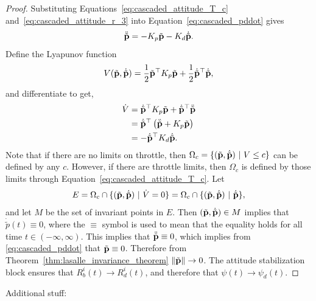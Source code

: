 \begin{proof}
Substituting Equations~\eqref{eq:cascaded_attitude_T_c} and~\eqref{eq:cascaded_attitude_r_3} into Equation~\eqref{eq:cascaded_pddot} gives
\begin{equation} \label{eq:cascaded_pddot}
\ddot{\tilde{\pbf}} = -K_p\tilde{\pbf} - K_d\dot{\tilde{\pbf}}.
\end{equation}
Define the Lyapunov function 
\[
V(\tilde{\mathbf{p}},\dot{\tilde{\mathbf{p}}}) = \frac{1}{2}\tilde{\mathbf{p}}^\top K_p \tilde{\mathbf{p}} + \frac{1}{2}\dot{\tilde{\mathbf{p}}}^\top \dot{\tilde{\mathbf{p}}},
\]
and differentiate to get,
\begin{align*}
\dot{V} &= \dot{\tilde{\mathbf{p}}}^\top K_p \tilde{\mathbf{p}} + \dot{\tilde{\mathbf{p}}}^\top \ddot{\tilde{\mathbf{p}}} \\
	&= \dot{\tilde{\mathbf{p}}}^\top \left(\ddot{\tilde{\mathbf{p}}} + K_p \tilde{\mathbf{p}} \right) \\
	&= -\dot{\tilde{\mathbf{p}}}^\top K_d \dot{\tilde{\mathbf{p}}}.
\end{align*}
Note that if there are no limits on throttle, then $\Omega_c = \{ (\tilde{\mathbf{p}}, \dot{\tilde{\mathbf{p}}}) ~|~ V \leq c \}$ can be defined by any $c$.  However, if there are throttle limits, then $\Omega_c$ is defined by those limits through Equation~\eqref{eq:cascaded_attitude_T_c}.  
Let 
\[
E=\Omega_c \cap \{(\tilde{\mathbf{p}},\dot{\tilde{\mathbf{p}}}) ~|~ \dot{V} = 0\} = \Omega_c \cap \{(\tilde{\mathbf{p}},\dot{\tilde{\mathbf{p}}}) ~|~ \dot{\tilde{\mathbf{p}}}\},
\]
and let $M$ be the set of invariant points in $E$.  Then $(\tilde{\mathbf{p}},\dot{\tilde{\mathbf{p}}})\in M $ implies that $\dot{\tilde{p}}(t)\equiv 0$, where the $\equiv$ symbol is used to mean that the equality holds for all time $t\in (-\infty, \infty)$.  This implies that $\ddot{\tilde{\mathbf{p}}}\equiv 0$, which implies from \eqref{eq:cascaded_pddot} that $\tilde{\mathbf{p}}\equiv 0$.  Therefore from Theorem~\ref{thm:lasalle_invariance_theorem} $\left\|\tilde{\mathbf{p}}\right\|\to 0$.  The attitude stabilization block ensures that $R_b^i(t) \to R_d^i(t)$, and therefore that $\psi(t)\to\psi_d(t)$.
\end{proof}

Additional stuff:

